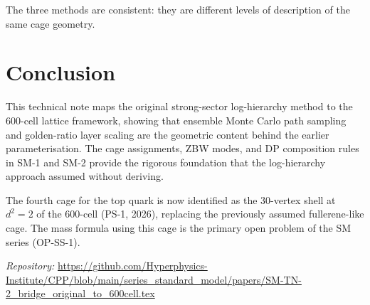 \documentclass[11pt]{article}
\begin{document}
The three methods are consistent: they are different levels of description
of the same cage geometry.

\section{Conclusion}

This technical note maps the original strong-sector log-hierarchy method
to the 600-cell lattice framework, showing that ensemble Monte Carlo
path sampling and golden-ratio layer scaling are the geometric content
behind the earlier parameterisation. The cage assignments, ZBW modes,
and DP composition rules in SM-1 and SM-2 provide the rigorous
foundation that the log-hierarchy approach assumed without deriving.

The fourth cage for the top quark is now identified as the 30-vertex
shell at $d^2 = 2$ of the 600-cell (PS-1, 2026), replacing the
previously assumed fullerene-like cage. The mass formula using this
cage is the primary open problem of the SM series (OP-SS-1).

\bigskip
\noindent\textit{Repository:}
\url{https://github.com/Hyperphysics-Institute/CPP/blob/main/series_standard_model/papers/SM-TN-2_bridge_original_to_600cell.tex}
\end{document}
